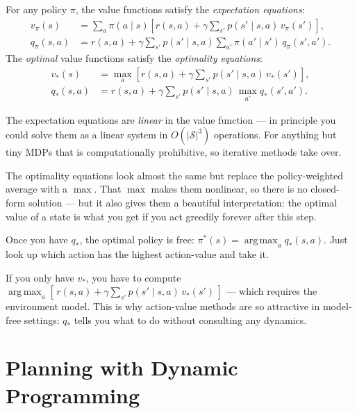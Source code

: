 \documentclass[11pt, oneside]{book}
\newcommand{\argmax}{\operatorname*{arg\,max}}
\newcommand{\Sset}{\mathcal{S}}          %
\newcommand{\vpi}{v_{\pi}}               %
\newcommand{\qpi}{q_{\pi}}               %
\newcommand{\vstar}{v_{*}}               %
\newcommand{\qstar}{q_{*}}               %
\begin{document}
\begin{thmbox}[title={Bellman Expectation and Optimality Equations}]
For any policy $\pi$, the value functions satisfy the \emph{expectation equations}:
\begin{align*}
  \vpi(s) &= \sum_a \pi(a\mid s)\!\left[r(s,a) + \gamma\sum_{s'} p(s'\mid s,a)\,\vpi(s')\right], \\[4pt]
  \qpi(s,a) &= r(s,a) + \gamma\sum_{s'} p(s'\mid s,a)\sum_{a'} \pi(a'\mid s')\,\qpi(s',a').
\end{align*}
The \emph{optimal} value functions satisfy the \emph{optimality equations}:
\begin{align*}
  \vstar(s) &= \max_a \!\left[r(s,a) + \gamma\sum_{s'} p(s'\mid s,a)\,\vstar(s')\right], \\[4pt]
  \qstar(s,a) &= r(s,a) + \gamma\sum_{s'} p(s'\mid s,a)\,\max_{a'}\qstar(s',a').
\end{align*}
\end{thmbox}

The expectation equations are \emph{linear} in the value function --- in principle
you could solve them as a linear system in $O(|\Sset|^3)$ operations.
For anything but tiny MDPs that is computationally prohibitive, so iterative methods
take over.

The optimality equations look almost the same but replace the policy-weighted
average with a $\max$.
That $\max$ makes them nonlinear, so there is no closed-form solution --- but it also
gives them a beautiful interpretation: the optimal value of a state is what you get
if you act greedily forever after this step.

\begin{intbox}[title={Why $\qstar$ is more useful than $\vstar$}]
Once you have $\qstar$, the optimal policy is free: $\pi^*(s) = \argmax_a \qstar(s, a)$.
Just look up which action has the highest action-value and take it.

If you only have $\vstar$, you have to compute
$\argmax_a [\, r(s,a) + \gamma \sum_{s'} p(s' \mid s, a)\, \vstar(s')\, ]$ ---
which requires the environment model.
This is why action-value methods are so attractive in model-free settings:
$\qstar$ tells you what to do without consulting any dynamics.
\end{intbox}

\section{Planning with Dynamic Programming}
\end{document}
